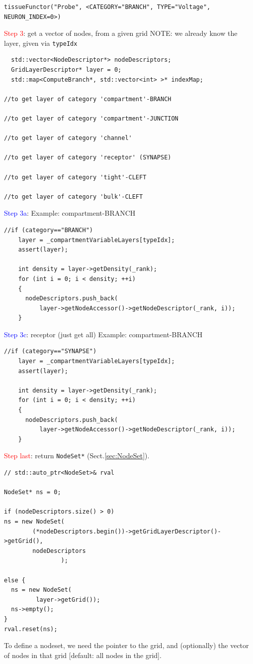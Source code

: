 \begin{verbatim}
tissueFunctor("Probe", <CATEGORY="BRANCH", TYPE="Voltage", NEURON_INDEX=0>)
\end{verbatim}

\textcolor{red}{Step 3}: get a vector of nodes, from a given grid
NOTE: we already know the layer, given via \verb!typeIdx!

{\tiny
\begin{lstlisting}
  std::vector<NodeDescriptor*> nodeDescriptors;
  GridLayerDescriptor* layer = 0;
  std::map<ComputeBranch*, std::vector<int> >* indexMap;

//to get layer of category 'compartment'-BRANCH

//to get layer of category 'compartment'-JUNCTION

//to get layer of category 'channel'

//to get layer of category 'receptor' (SYNAPSE)

//to get layer of category 'tight'-CLEFT

//to get layer of category 'bulk'-CLEFT

\end{lstlisting}
}

\textcolor{blue}{Step 3a}: 
Example: compartment-BRANCH
\begin{lstlisting}
//if (category=="BRANCH")
    layer = _compartmentVariableLayers[typeIdx];
    assert(layer);

    int density = layer->getDensity(_rank); 
    for (int i = 0; i < density; ++i)
    {
      nodeDescriptors.push_back(
          layer->getNodeAccessor()->getNodeDescriptor(_rank, i));
    }

\end{lstlisting}

\textcolor{blue}{Step 3c}: receptor (just get all)  
Example: compartment-BRANCH
\begin{lstlisting}
//if (category=="SYNAPSE")
    layer = _compartmentVariableLayers[typeIdx];
    assert(layer);

    int density = layer->getDensity(_rank); 
    for (int i = 0; i < density; ++i)
    {
      nodeDescriptors.push_back(
          layer->getNodeAccessor()->getNodeDescriptor(_rank, i));
    }

\end{lstlisting}


\textcolor{red}{Step last}: return \verb!NodeSet*! (Sect.\ref{sec:NodeSet}).

\begin{lstlisting}
// std::auto_ptr<NodeSet>& rval

NodeSet* ns = 0;

if (nodeDescriptors.size() > 0)
ns = new NodeSet(
        (*nodeDescriptors.begin())->getGridLayerDescriptor()->getGrid(),
        nodeDescriptors
                );
                
else {
  ns = new NodeSet(
         layer->getGrid());
  ns->empty();
}
rval.reset(ns);
\end{lstlisting}  
To define a nodeset, we need the pointer to the grid, and (optionally) the
vector of nodes in that grid [default: all nodes in the grid].




